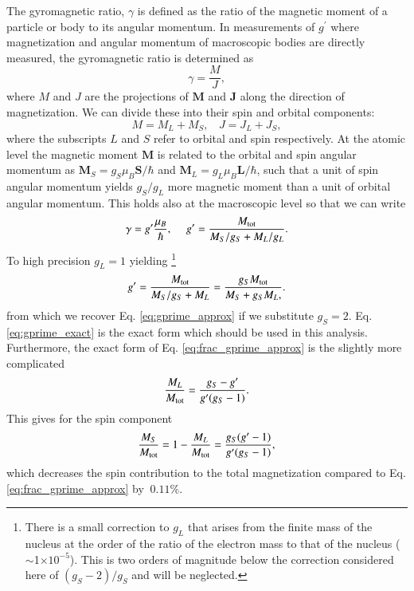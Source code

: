 \documentclass[preprint,12pt]{elsarticle}
\begin{document}
The gyromagnetic ratio, $\gamma$ is defined as the ratio of the magnetic moment of a particle or body to its angular momentum. In measurements of $g^\prime$ where magnetization and angular momentum of macroscopic bodies are directly measured, the gyromagnetic ratio is determined as 
\[
\gamma=\frac{M}{J},
\]
where $M$ and $J$ are the projections of $\textbf{M}$ and $\textbf{J}$ along the direction of magnetization. We can divide these into their spin and orbital components:
\[
M=M_{L}+M_{S},~~~~J=J_{L}+J_{S},
\]
where the subscripts $L$ and $S$ refer to orbital and spin respectively.  At the atomic level the magnetic moment $\textbf{M}$ is related to the orbital and spin angular momentum as $\textbf{M}_{S}=g_{S}\mu_B\textbf{S}/\hbar$ and $\textbf{M}_{L}=g_{L}\mu_B\textbf{L}/\hbar$, such that a unit of spin angular momentum yields $g_S/g_L$ more magnetic moment than a unit of orbital angular momentum. This holds also at the macroscopic level so that we can write
\begin{equation}
\gamma=g^{\prime}\frac{\mu_B}{\hbar},~~~~~g^\prime=\frac{M_{\rm tot}}{M_{S}/g_{S}+M_{L}/g_{L}}.
\end{equation}
To high precision $g_{L}=1$ yielding \footnote{There is a small correction to $g_{L}$ that arises from the finite mass of the nucleus at the order of the ratio of the electron mass to that of the nucleus ($\sim$1$\times10^{-5}$)\cite{Phillips1949}. This is two orders of magnitude below the correction considered here of $(g_S-2)/g_S$ and will be neglected.}
\begin{equation}
g^{\prime}=\frac{M_{\rm tot}}{M_{S}/g_{S}+M_{L}}=\frac{g_SM_{\rm tot}}{M_{S}+g_{S}M_{L},}.
\label{eq:gprime_exact}
\end{equation}
from which we recover Eq. \ref{eq:gprime_approx} if we substitute $g_{S}=2$. Eq. \ref{eq:gprime_exact} is the exact form which should be used in this analysis. Furthermore, the exact form of Eq. \ref{eq:frac_gprime_approx} is the slightly more complicated
\begin{equation}
\frac{M_{L}}{M_{\rm tot}}=\frac{g_{S}-g^{\prime}}{g^{\prime}(g_{S}-1)}.
\label{eq:frac_gprime_exact}
\end{equation}
This gives for the spin component
\begin{equation}
\frac{M_{S}}{M_{\rm tot}}=1-\frac{M_{L}}{M_{\rm tot}}=\frac{g_{S}(g^{\prime}-1)}{g^{\prime}(g_{S}-1)},
\label{eq:frac_sp_exact}
\end{equation}
which decreases the spin contribution to the total magnetization compared to Eq. \ref{eq:frac_gprime_approx} by $~0.11\%$.
\end{document}
